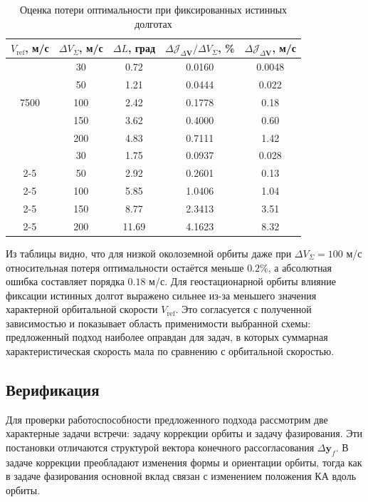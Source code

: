 \begin{table}[!h]
\centering
\caption{Оценка потери оптимальности при фиксированных истинных долготах}
\label{tab::J_dv_error}
\begin{tabular}{|c|c|c|c|c|}
\hline
$V_{\mathrm{ref}}$, м/с 
& $\Delta V_{\Sigma}$, м/с 
& $\Delta L$, град 
& $\Delta \mathcal{J}_{\Delta \mathbf{V}} / \Delta V_{\Sigma}$, \%
& $\Delta \mathcal{J}_{\Delta \mathbf{V}}$, м/с \\
\hline
\multirow{5}{*}{7500} & 30  & 0.72 & 0.0160 & 0.0048 \\
\cline{2-5}
& 50  & 1.21 & 0.0444 & 0.022 \\
\cline{2-5}
& 100 & 2.42 & 0.1778 & 0.18 \\
\cline{2-5}
& 150 & 3.62 & 0.4000 & 0.60 \\
\cline{2-5}
& 200 & 4.83 & 0.7111 & 1.42 \\
\hhline{|=|=|=|=|=|}
\multirow{5}{*}{3100} & 30  & 1.75 & 0.0937 & 0.028 \\
\cline{2-5}
& 50  & 2.92 & 0.2601 & 0.13 \\
\cline{2-5}
& 100 & 5.85 & 1.0406 & 1.04 \\
\cline{2-5}
& 150 & 8.77 & 2.3413 & 3.51 \\
\cline{2-5}
& 200 & 11.69 & 4.1623 & 8.32 \\
\hline
\end{tabular}
\end{table}

Из таблицы видно, что для низкой околоземной орбиты даже при $\Delta V_{\Sigma} = 100$ м/с относительная потеря оптимальности остаётся меньше $0.2 \%$, а абсолютная ошибка составляет порядка $0.18$ м/с. Для геостационарной орбиты влияние фиксации истинных долгот выражено сильнее из-за меньшего значения характерной орбитальной скорости $V_{\mathrm{ref}}$. Это согласуется с полученной зависимостью и показывает область применимости выбранной схемы: предложенный подход наиболее оправдан для задач, в которых суммарная характеристическая скорость мала по сравнению с орбитальной скоростью.

\subsection{Верификация}

Для проверки работоспособности предложенного подхода рассмотрим две характерные задачи встречи: задачу коррекции орбиты и задачу фазирования. Эти постановки отличаются структурой вектора конечного рассогласования $\Delta \mathbf{y}_f$. В задаче коррекции преобладают изменения формы и ориентации орбиты, тогда как в задаче фазирования основной вклад связан с изменением положения КА вдоль орбиты.

